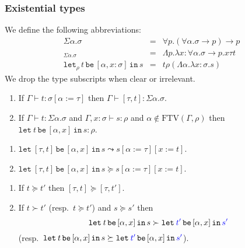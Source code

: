 \documentclass[runningheads,a4paper]{llncs}
\newcommand{\arrtype}{\rightarrow}
\newcommand{\abs}[2]{\lambda #1.#2}
\newcommand{\tabs}[2]{\Lambda #1.#2}
\newcommand{\expair}[2]{[#1,#2]}
\newcommand{\subst}[2]{#1:=#2}
\newcommand{\FTV}{\mathrm{FTV}}
\newcommand{\flatten}{\mathtt{flatten}}
\newcommand{\lift}{\mathtt{lift}}
\newcommand{\proves}{\vdash}
\newcommand{\xlet}[4]{\mathtt{let}_{#1}\,#2\,\mathtt{be}\,[#3]\,\mathtt{in}\,#4}
\newcommand{\CKchange}[1]{\textcolor{blue}{#1}}
\begin{document}
\subsubsection{Existential types}

\begin{definition}\normalfont
  We define the following abbreviations:
  \[
  \begin{array}{rcl}
    \Sigma \alpha . \sigma &=& \forall p . (\forall \alpha . \sigma \arrtype p) \arrtype p \\
    \expair{\tau}{t}_{\Sigma\alpha.\sigma} &=& \tabs{p}{\abs{x:\forall\alpha.\sigma\arrtype p}{x \tau t %
    }} \\
    \xlet{\rho}{t}{\alpha,x:\sigma}{s} &=& t \rho (\tabs{\alpha}{\abs{x:\sigma}{s}})
  \end{array}
  \]
  We drop the type subscripts when clear or irrelevant.
\end{definition}

\begin{lemma}
  \begin{enumerate}
  \item If $\Gamma \proves t : \sigma[\subst{\alpha}{\tau}]$ then
    $\Gamma \proves \expair{\tau}{t} : \Sigma \alpha . \sigma$.
  \item If $\Gamma \proves t : \Sigma \alpha . \sigma$ and
    $\Gamma,x:\sigma \proves s : \rho$ and $\alpha \notin
    \FTV(\Gamma,\rho)$ then $\xlet{}{t}{\alpha,x}{s} : \rho$.
  \end{enumerate}
\end{lemma}

\begin{lemma}
  \begin{enumerate}
  \item $\xlet{}{\expair{\tau}{t}}{\alpha,x}{s} \leadsto
    s[\subst{\alpha}{\tau}][\subst{x}{t}] %
    $.
  \item $\xlet{}{\expair{\tau}{t}}{\alpha,x}{s} \succeq
    s[\subst{\alpha}{\tau}][\subst{x}{t}]$.
  \end{enumerate}
\end{lemma}

\begin{lemma}
  \begin{enumerate}
  \item If $t \succeq t'$ then $\expair{\tau}{t} \succeq
    \expair{\tau}{t'}$.
  \item If $t \succ t'$ (resp.~$t \succeq t'$) and $s \succeq s'$ then
    \[
    \xlet{}{t}{\alpha,x}{s} \succ \xlet{}{\CKchange{t'}}{\alpha,x}{\CKchange{s'}}
    \]
    (resp.~$\xlet{}{t}{\alpha,x}{s} \succeq \xlet{}{\CKchange{t'}}{\alpha,x}{\CKchange{s'}}$).
  \end{enumerate}
\end{lemma}
\end{document}
